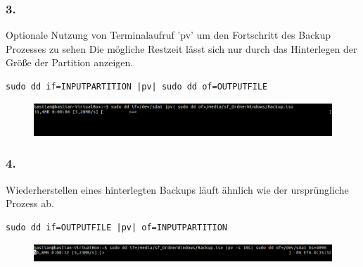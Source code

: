 \subsubsection*{3.}
Optionale Nutzung von Terminalaufruf 'pv' um den Fortschritt des Backup Prozesses zu sehen Die mögliche Restzeit lässt sich nur durch das Hinterlegen der Größe der Partition anzeigen.
\begin{lstlisting}
sudo dd if=INPUTPARTITION |pv| sudo dd of=OUTPUTFILE
\end{lstlisting}
\begin{figure}[ht]
\includegraphics[width=\textwidth]{pictures/Bastian/BILD2_pv}
\end{figure}

\subsubsection*{4.}
Wiederherstellen eines hinterlegten Backups läuft ähnlich wie der ursprüngliche Prozess ab.
\begin{lstlisting}
sudo dd if=OUTPUTFILE |pv| of=INPUTPARTITION
\end{lstlisting}
\begin{figure}[ht]
\includegraphics[width=\textwidth]{pictures/Bastian/BILD3_pv}
\end{figure}
\newpage %

